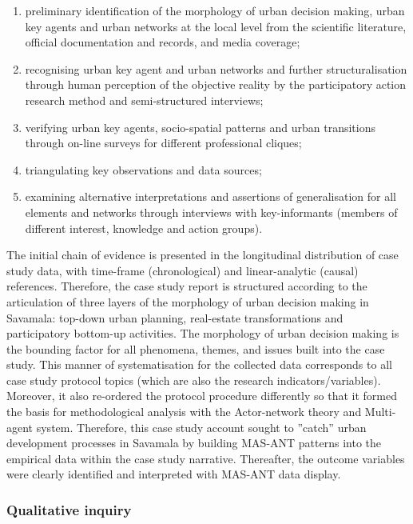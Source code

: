 \documentclass[11pt]{report}
\begin{document}
\begin{enumerate}
\item preliminary identification of the morphology of urban decision making, urban key agents and urban networks at the local level from the scientific literature, official documentation and records, and media coverage;
\item recognising urban key agent and urban networks and further structuralisation through human perception of the objective reality by the participatory action research method and semi-structured interviews;
\item verifying urban key agents, socio-spatial patterns and urban transitions through on-line surveys for different professional cliques;
\item triangulating key observations and data sources;
\item examining alternative interpretations and assertions of generalisation for all elements and networks through interviews with key-informants (members of different interest, knowledge and action groups).
\end{enumerate}

The initial chain of evidence is presented in the longitudinal distribution of case study data, with time-frame (chronological) and linear-analytic (causal) references. Therefore, the case study report is structured according to the articulation of three layers of the morphology of urban decision making in Savamala: top-down urban planning, real-estate transformations and participatory bottom-up activities. The morphology of urban decision making is the bounding factor for all phenomena, themes, and issues built into the case study.  This manner of systematisation for the collected data corresponds to all case study protocol topics (which are also the research indicators/variables). Moreover, it also re-ordered the protocol procedure differently so that it formed the basis for methodological analysis with the Actor-network theory and Multi-agent system. Therefore, this case study account sought to ”catch” urban development processes in Savamala by building MAS-ANT patterns into the empirical data within the case study narrative. Thereafter, the outcome variables were clearly identified and interpreted with MAS-ANT data display. 

\subsubsection{Qualitative inquiry}
\end{document}
